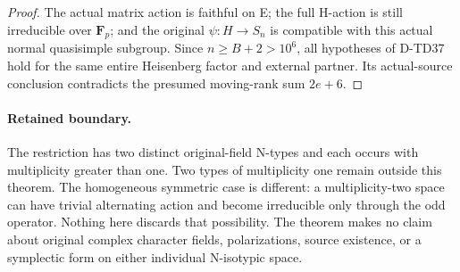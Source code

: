 \begin{proof}
The actual matrix action is faithful on E; the full H-action is
still irreducible over \(\mathbf F_p\); and the original
\(\psi:H\to S_n\) is compatible with this actual normal
quasisimple subgroup.  Since \(n\ge B+2>10^6\), all
hypotheses of D-TD37 hold for the same entire Heisenberg factor
and external partner.  Its actual-source conclusion contradicts
the presumed moving-rank sum \(2e+6\).
\end{proof}

\paragraph{Retained boundary.}
The restriction has two distinct original-field N-types and each
occurs with multiplicity greater than one.  Two types of
multiplicity one remain outside this theorem.  The homogeneous
symmetric case is different: a multiplicity-two space can have
trivial alternating action and become irreducible only through
the odd operator.  Nothing here discards that possibility.
The theorem makes no claim about original complex character fields,
polarizations, source existence, or a symplectic form on either
individual N-isotypic space.
